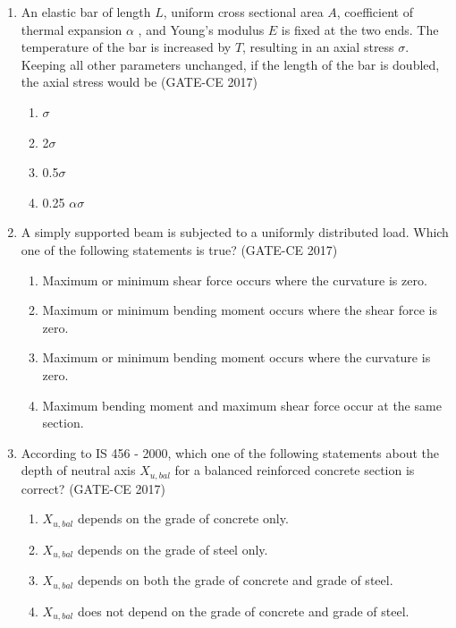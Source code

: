 \documentclass[journal,12pt,onecolumn]{article}
\theoremstyle{remark}
\begin{document}
\begin{enumerate}
    \item An elastic bar of length $L$, uniform cross sectional area $A$, coefficient of thermal expansion $\alpha$ , and Young's modulus $E$ is fixed at the two ends. The temperature of the bar is increased by $T$, resulting in an axial stress $\sigma$. Keeping all other parameters unchanged, if the length of the bar is doubled, the axial stress would be \hfill (GATE-CE 2017)
    \begin{multicols}{4}
    \begin{enumerate}
        \item $\sigma$
        \item 2$\sigma$
        \item 0.5$\sigma$
        \item 0.25 $\alpha \sigma$
    \end{enumerate}
    \end{multicols}

    \item A simply supported beam is subjected to a uniformly distributed load. Which one of the following statements is true? \hfill (GATE-CE 2017)
    \begin{enumerate}
        \item Maximum or minimum shear force occurs where the curvature is zero.
        \item Maximum or minimum bending moment occurs where the shear force is zero.
        \item Maximum or minimum bending moment occurs where the curvature is zero.
        \item Maximum bending moment and maximum shear force occur at the same section.
    \end{enumerate}

    \item According to IS 456 - 2000, which one of the following statements about the depth of neutral axis $X_{u,bal}$ for a balanced reinforced concrete section is correct? \hfill (GATE-CE 2017)
    \begin{enumerate}
        \item $X_{u,bal}$ depends on the grade of concrete only.
        \item $X_{u,bal}$ depends on the grade of steel only.
        \item $X_{u,bal}$ depends on both the grade of concrete and grade of steel.
        \item $X_{u,bal}$ does not depend on the grade of concrete and grade of steel.
    \end{enumerate}


\end{enumerate}
\end{document}
